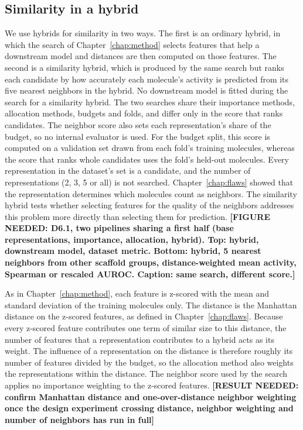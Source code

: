 \subsection{Similarity in a hybrid}

We use hybrids for similarity in two ways. The first is an ordinary hybrid, in which the search of Chapter~\ref{chap:method} selects features that help a downstream model and distances are then computed on those features. The second is a similarity hybrid, which is produced by the same search but ranks each candidate by how accurately each molecule's activity is predicted from its five nearest neighbors in the hybrid. No downstream model is fitted during the search for a similarity hybrid. The two searches share their importance methods, allocation methods, budgets and folds, and differ only in the score that ranks candidates. The neighbor score also sets each representation's share of the budget, so no internal evaluator is used. For the budget split, this score is computed on a validation set drawn from each fold's training molecules, whereas the score that ranks whole candidates uses the fold's held-out molecules. Every representation in the dataset's set is a candidate, and the number of representations (2, 3, 5 or all) is not searched. Chapter~\ref{chap:flaws} showed that the representation determines which molecules count as neighbors. The similarity hybrid tests whether selecting features for the quality of the neighbors addresses this problem more directly than selecting them for prediction. \textbf{[FIGURE NEEDED: D6.1, two pipelines sharing a first half (base representations, importance, allocation, hybrid). Top: hybrid, downstream model, dataset metric. Bottom: hybrid, 5 nearest neighbors from other scaffold groups, distance-weighted mean activity, Spearman or rescaled AUROC. Caption: same search, different score.]}

As in Chapter~\ref{chap:method}, each feature is z-scored with the mean and standard deviation of the training molecules only. The distance is the Manhattan distance on the z-scored features, as defined in Chapter~\ref{chap:flaws}. Because every z-scored feature contributes one term of similar size to this distance, the number of features that a representation contributes to a hybrid acts as its weight. The influence of a representation on the distance is therefore roughly its number of features divided by the budget, so the allocation method also weights the representations within the distance. The neighbor score used by the search applies no importance weighting to the z-scored features. \textbf{[RESULT NEEDED: confirm Manhattan distance and one-over-distance neighbor weighting once the design experiment crossing distance, neighbor weighting and number of neighbors has run in full]}

